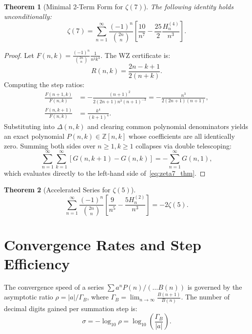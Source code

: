 \documentclass[11pt,a4paper]{article}
\newtheorem{theorem}{Theorem}[section]
\theoremstyle{definition}
\begin{document}
\begin{theorem}[Minimal 2-Term Form for $\zeta(7)$]\label{thm:zeta7_wz}
The following identity holds unconditionally:
\begin{equation}\label{eq:zeta7_thm}
\zeta(7) = \sum_{n=1}^\infty \frac{(-1)^n}{\binom{2n}{n}} \left[ \frac{10}{n^7} - \frac{25}{2}\frac{H_n^{(4)}}{n^3} \right].
\end{equation}
\end{theorem}

\begin{proof}
Let $F(n, k) = \frac{(-1)^n}{\binom{2n}{n}} \frac{1}{n^3 k^4}$. The WZ certificate is:
\begin{equation}
R(n, k) = \frac{2n - k + 1}{2(n + k)}.
\end{equation}
Computing the step ratios:
\begin{align}
\frac{F(n+1, k)}{F(n, k)} &= -\frac{(n+1)^2}{2(2n+1)n^3 (n+1)^{-3}} = -\frac{n^3}{2(2n+1)(n+1)}, \\
\frac{F(n, k+1)}{F(n, k)} &= \frac{k^4}{(k+1)^4}.
\end{align}
Substituting into $\Delta(n, k)$ and clearing common polynomial denominators yields an exact polynomial $P(n, k) \in \mathbb{Z}[n, k]$ whose coefficients are all identically zero. Summing both sides over $n \ge 1, k \ge 1$ collapses via double telescoping:
\begin{equation}
\sum_{n=1}^\infty \sum_{k=1}^\infty [G(n, k+1) - G(n, k)] = -\sum_{n=1}^\infty G(n, 1),
\end{equation}
which evaluates directly to the left-hand side of~\eqref{eq:zeta7_thm}.
\end{proof}

\begin{theorem}[Accelerated Series for $\zeta(5)$]
\begin{equation}
\sum_{n=1}^\infty \frac{(-1)^n}{\binom{2n}{n}} \left[ \frac{9}{n^5} - \frac{5H_n^{(2)}}{n^3} \right] = -2\zeta(5).
\end{equation}
\end{theorem}

\section{Convergence Rates and Step Efficiency}

The convergence speed of a series $\sum a^n P(n) / (\dots B(n))$ is governed by the asymptotic ratio $\rho = |a| / \Gamma_B$, where $\Gamma_B = \lim_{n \to \infty} \frac{B(n+1)}{B(n)}$. The number of decimal digits gained per summation step is:
\begin{equation}
\sigma = -\log_{10} \rho = \log_{10} \left( \frac{\Gamma_B}{|a|} \right).
\end{equation}
\end{document}

